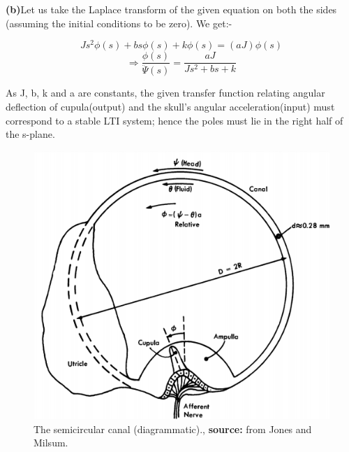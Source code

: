 \documentclass[15.7pt]{article}
\renewcommand\part[1]{\vspace{.10in}\textbf{(#1)}}
\begin{document}
\part{b}Let us take the Laplace transform of the given equation on both the sides (assuming the initial conditions to be zero). We get:-
\begin{center}
    \[Js^{2}\phi(s) + bs\phi(s) + k\phi(s) = (aJ)\phi(s)\]
    \[\Rightarrow \boxed{ \frac{\phi(s)}{\ddot \Psi(s)} = \frac{aJ}{Js^{2} + bs +k} } \]
\end{center}
\begin{flushleft}
As J, b, k and a are constants, the given transfer function relating angular deflection of cupula(output) and the skull's angular acceleration(input) must correspond to a stable LTI system; hence the poles must lie in the right half of the s-plane.
\end{flushleft}
\begin{figure}[h]
        \centering
        \includegraphics[scale=0.5]{The semicircular canal.png}
        \caption{The semicircular canal (diagrammatic)., \textbf{source:} from Jones and Milsum.}
    \end{figure}   
\end{document}
